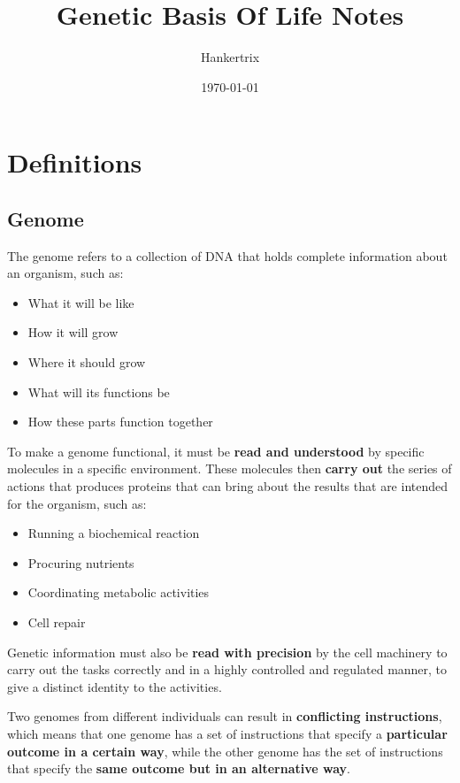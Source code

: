 \documentclass[11pt]{article}
\author{Hankertrix}
\date{\today}
\title{Genetic Basis Of Life Notes}
\begin{document}
\maketitle
\setcounter{tocdepth}{2}
\tableofcontents \clearpage\newpage
\section{Definitions}
\label{sec:orgedd823f}

\subsection{Genome}
\label{sec:org6157e37}
The genome refers to a collection of DNA that holds complete information about an organism, such as:
\begin{itemize}
\item What it will be like
\item How it will grow
\item Where it should grow
\item What will its functions be
\item How these parts function together
\end{itemize}

To make a genome functional, it must be \textbf{read and understood} by specific molecules in a specific environment. These molecules then \textbf{carry out} the series of actions that produces proteins that can bring about the results that are intended for the organism, such as:
\begin{itemize}
\item Running a biochemical reaction
\item Procuring nutrients
\item Coordinating metabolic activities
\item Cell repair
\end{itemize}

Genetic information must also be \textbf{read with precision} by the cell machinery to carry out the tasks correctly and in a highly controlled and regulated manner, to give a distinct identity to the activities.


Two genomes from different individuals can result in \textbf{conflicting instructions}, which means that one genome has a set of instructions that specify a \textbf{particular outcome in a certain way}, while the other genome has the set of instructions that specify the \textbf{same outcome but in an alternative way}.
\end{document}
